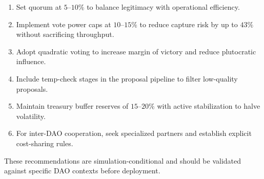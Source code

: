 \begin{enumerate}
    \item Set quorum at $5$--$10\%$ to balance legitimacy with operational efficiency.
    \item Implement vote power caps at $10$--$15\%$ to reduce capture risk by up to $43\%$ without sacrificing throughput.
    \item Adopt quadratic voting to increase margin of victory and reduce plutocratic influence.
    \item Include temp-check stages in the proposal pipeline to filter low-quality proposals.
    \item Maintain treasury buffer reserves of $15$--$20\%$ with active stabilization to halve volatility.
    \item For inter-DAO cooperation, seek specialized partners and establish explicit cost-sharing rules.
\end{enumerate}

These recommendations are simulation-conditional and should be validated against specific DAO contexts before deployment.
